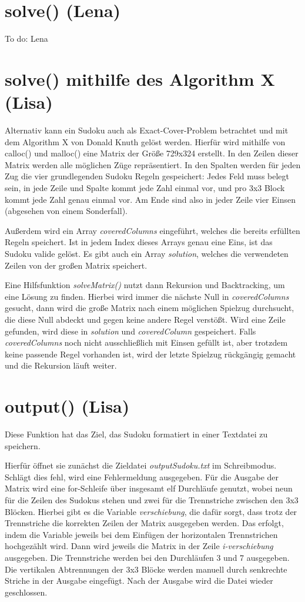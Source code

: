 \documentclass[a4paper,10pt]{article}
\begin{document}
\section{solve() (Lena)}
To do: Lena

\section{solve() mithilfe des Algorithm X (Lisa)}

Alternativ kann ein Sudoku auch als Exact-Cover-Problem betrachtet und mit dem Algorithm X von Donald Knuth gelöst werden. Hierfür wird mithilfe von calloc() und malloc() eine Matrix der Größe 729x324 erstellt. In den Zeilen dieser Matrix werden alle möglichen Züge repräsentiert. In den Spalten werden für jeden Zug die vier grundlegenden Sudoku Regeln gespeichert: Jedes Feld muss belegt sein, in jede Zeile und Spalte kommt jede Zahl einmal vor, und pro 3x3 Block kommt jede Zahl genau einmal vor. Am Ende sind also in jeder Zeile vier Einsen (abgesehen von einem Sonderfall).

Außerdem wird ein Array \textit{coveredColumns} eingeführt, welches die bereits erfüllten Regeln speichert. Ist in jedem Index dieses Arrays genau eine Eins, ist das Sudoku valide gelöst. Es gibt auch ein Array \textit{solution}, welches die verwendeten Zeilen von der großen Matrix speichert. 

Eine Hilfsfunktion \textit{solveMatrix()} nutzt dann Rekursion und Backtracking, um eine Lösung zu finden. Hierbei wird immer die nächste Null in \textit{coveredColumns} gesucht, dann wird die große Matrix nach einem möglichen Spielzug durchsucht, die diese Null abdeckt und gegen keine andere Regel verstößt. Wird eine Zeile gefunden, wird diese in \textit{solution} und \textit{coveredColumn} gespeichert. Falls \textit{coveredColumns} noch nicht ausschließlich mit Einsen gefüllt ist, aber trotzdem keine passende Regel vorhanden ist, wird der letzte Spielzug rückgängig gemacht und die Rekursion läuft weiter.

\section{output() (Lisa)}

Diese Funktion hat das Ziel, das Sudoku formatiert in einer Textdatei zu speichern. 

Hierfür öffnet sie zunächst die Zieldatei \textit{outputSudoku.txt} im Schreibmodus. Schlägt dies fehl, wird eine Fehlermeldung ausgegeben. Für die Ausgabe der Matrix wird eine for-Schleife über insgesamt elf Durchläufe genutzt, wobei neun für die Zeilen des Sudokus stehen und zwei für die Trennstriche zwischen den 3x3 Blöcken. Hierbei gibt es die Variable \textit{verschiebung}, die dafür sorgt, dass trotz der Trennstriche die korrekten Zeilen der Matrix ausgegeben werden. Das erfolgt, indem die Variable jeweils bei dem Einfügen der horizontalen Trennstrichen hochgezählt wird. Dann wird jeweils die Matrix in der Zeile \textit{i-verschiebung} ausgegeben. Die Trennstriche werden bei den Durchläufen 3 und 7 ausgegeben. Die vertikalen Abtrennungen der 3x3 Blöcke werden manuell durch senkrechte Striche in der Ausgabe eingefügt. Nach der Ausgabe wird die Datei wieder geschlossen.
\end{document}
